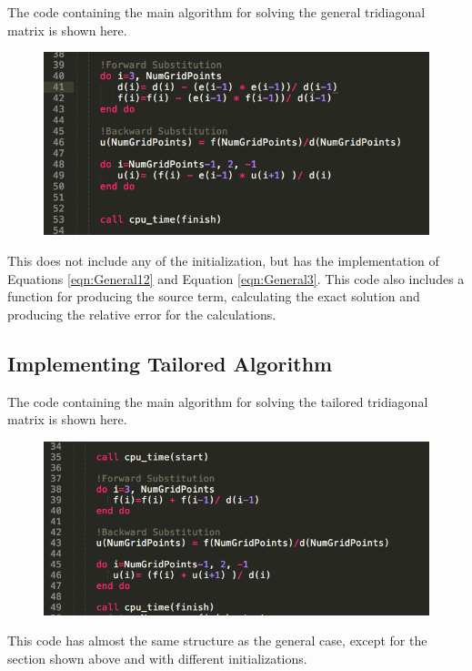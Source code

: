 \documentclass[%
oneside,                 %
final,                   %
10pt]{article}
\begin{document}
The code containing the main algorithm for solving the general tridiagonal matrix is shown here.

\begin{figure}[H]
  \centering
    \includegraphics[width=1.2\textwidth]{GeneralAlgorithm}
\end{figure}

This does not include any of the initialization, but has the implementation of Equations \ref{eqn:General12} and Equation \ref{eqn:General3}.  This code also includes a function for producing the source term, calculating the exact solution and producing the relative error for the calculations.

\subsection{Implementing Tailored Algorithm}

The code containing the main algorithm for solving the tailored tridiagonal matrix is shown here.

\begin{figure}[H]
  \centering
    \includegraphics[width=1.2\textwidth]{SpecificAlgorithm}
\end{figure}

This code has almost the same structure as the general case, except for the section shown above and with different initializations.
\end{document}
